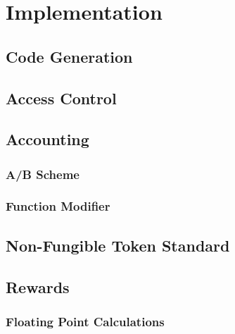 
\chapter{Implementation}
\label{chp:implementation}

\section{Code Generation}

\section{Access Control}

\section{Accounting}

\subsection{A/B Scheme}
\subsection{Function Modifier}


\section{Non-Fungible Token Standard}

\section{Rewards}
\subsection{Floating Point Calculations}
